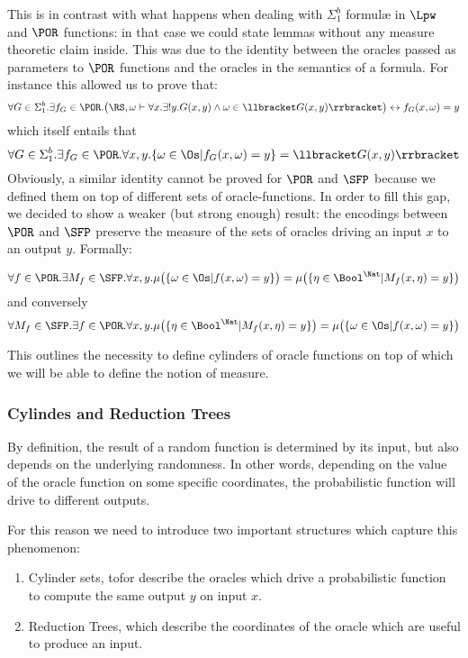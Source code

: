 \begin{conditional}{\notappendix}
  This is in contrast with what happens when dealing with $\Sigma^b_1$ formul\ae{} in $\Lpw$
  and $\POR$ functions:  in that case we could state lemmas without any measure
  theoretic claim inside. This was due to the identity between the oracles
  passed as parameters to $\POR$ functions and the oracles in the semantics
  of a formula. For instance this allowed us to prove that:
%
  \[
  \forall G \in \Sigma^b_1. \exists f_G \in \POR. \big(\RS, \omega \vdash \forall x. \exists ! y. G(x, y) \land \omega \in \llbracket G(x, y) \rrbracket\big)  \leftrightarrow f_G(x, \omega) = y
  \]
%
  which itself entails that
%
  \[
  \forall G\in \Sigma^b_1. \exists f_G \in \POR.
  \forall x, y. \{\omega \in \Os | f_G(x, \omega)=y\} = \llbracket G(x, y)\rrbracket
  \]
%
  Obviously, a similar identity cannot be proved for $\POR$ and $\SFP$ because
  we defined them on top of different sets of oracle-functions.
  In order to fill this gap, we decided to show a weaker (but strong enough) result:
  the encodings between $\POR$ and $\SFP$ preserve the measure of the
  sets of oracles driving an input $x$ to an output $y$. Formally:
%
\begin{conj}
  \label{conj:SFP}
  \[
  \forall f\in \POR. \exists M_f \in \SFP.
  \forall x, y.\mu\big( \{\omega \in \Os | f(x, \omega)=y\} \big)=
  \mu \big(\{\eta \in \Bool^\Nat | M_f(x, \eta)=y\}\big)
  \]
  and conversely
  \[
  \forall M_f \in \SFP. \exists f\in \POR.
  \forall x, y.\mu \big(\{\eta \in \Bool^\Nat | M_f(x, \eta)=y\}\big)=
  \mu\big( \{\omega \in \Os | f(x, \omega)=y\} \big)
  \]
\end{conj}
%
  This outlines the necessity to define cylinders of oracle functions on top
  of which we will be able to define the notion of measure.

\subsubsection{Cylindes and Reduction Trees}

By definition, the result of a random function is determined
by its input, but also depends on the underlying randomness. In other words,
depending on the value of the oracle function on some specific coordinates,
the probabilistic function will drive to different outputs.

For this reason we need to introduce two important structures which capture this
phenomenon:

\begin{enumerate}
  \item Cylinder sets, tofor describe the oracles which drive a probabilistic
  function to compute the same output $y$ on input $x$.
  \item Reduction Trees, which describe the coordinates of the oracle which are useful
  to produce an input.
\end{enumerate}


\end{conditional}
